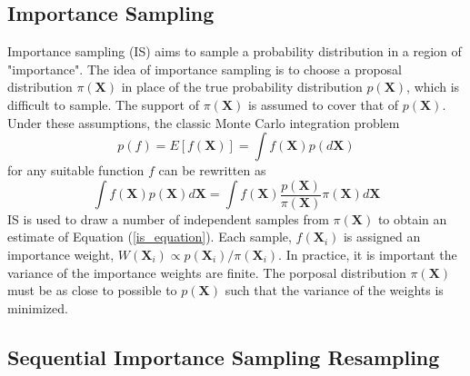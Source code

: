 \documentclass[11pt,a4,twosided,singlespacing,titlepagenumber=on]{scrreprt}
\numberwithin{equation}{chapter} %
\theoremstyle{remark}
\newcommand{\matr}[1]{\mathbf{#1}}
\begin{document}
\subsection{Importance Sampling}
Importance sampling (IS) aims to sample a probability distribution in a region of "importance". The idea of importance sampling is to choose a proposal distribution $\pi(\matr{X})$ in place of the true probability distribution $p(\matr{X})$, which is difficult to sample. The support of $\pi(\matr{X})$ is assumed to cover that of $p(\matr{X})$. Under these assumptions, the classic Monte Carlo integration problem
\begin{equation}
p(f) = E[f(\matr{X})] = \int f(\matr{X})p(d\matr{X})
\end{equation}
for any suitable function $f$ can be rewritten as
\begin{equation}
\int f(\matr{X})p(\matr{X})d\matr{X} = \int f(\matr{X}) \frac{p(\matr{X})}{\pi(\matr{X})} \pi(\matr{X}) d\matr{X} \label{is_equation}
\end{equation}
IS is used to draw a number of independent samples from $\pi(\matr{X})$ to obtain an estimate of Equation (\ref{is_equation}). Each sample, $f(\matr{X}_i)$ is assigned an importance weight, $W(\matr{X}_i) \propto p(\matr{X}_i)/\pi(\matr{X}_i)$. In practice, it is important the variance of the importance weights are finite. The porposal distribution $\pi(\matr{X})$ must be as close to possible to $p(\matr{X})$ such that the variance of the weights is minimized. 

\subsection{Sequential Importance Sampling Resampling}
\end{document}

